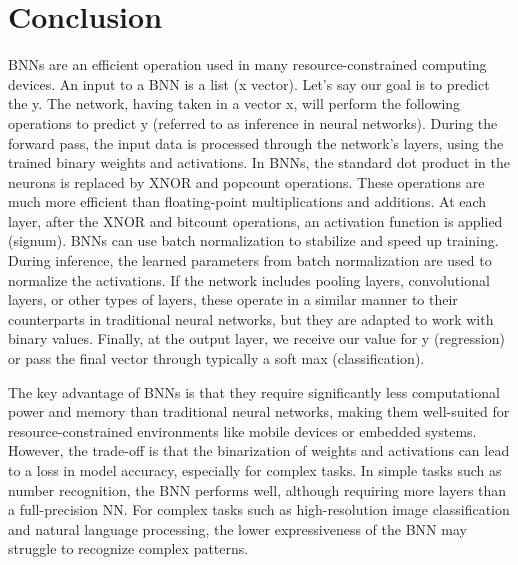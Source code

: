 \section{Conclusion}
BNNs are an efficient operation used in many resource-constrained computing devices. An input to a BNN is a list (x vector). Let's say our goal is to predict the y. The network, having taken in a vector x, will perform the following operations to predict y (referred to as inference in neural networks). During the forward pass, the input data is processed through the network's layers, using the trained binary weights and activations. In BNNs, the standard dot product in the neurons is replaced by XNOR and popcount operations. These operations are much more efficient than floating-point multiplications and additions. At each layer, after the XNOR and bitcount operations, an activation function is applied (signum). BNNs can use batch normalization to stabilize and speed up training. During inference, the learned parameters from batch normalization are used to normalize the activations. If the network includes pooling layers, convolutional layers, or other types of layers, these operate in a similar manner to their counterparts in traditional neural networks, but they are adapted to work with binary values. Finally, at the output layer, we receive our value for y (regression) or pass the final vector through typically a soft max (classification).

The key advantage of BNNs is that they require significantly less computational power and memory than traditional neural networks, making them well-suited for resource-constrained environments like mobile devices or embedded systems. However, the trade-off is that the binarization of weights and activations can lead to a loss in model accuracy, especially for complex tasks. In simple tasks such as number recognition, the BNN performs well, although requiring more layers than a full-precision NN. For complex tasks such as high-resolution image classification and natural language processing, the lower expressiveness of the BNN may struggle to recognize complex patterns.



